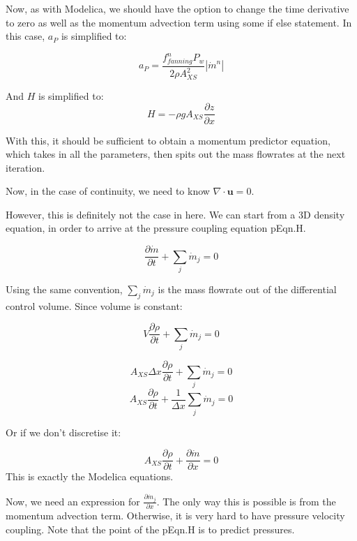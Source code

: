 \documentclass[masters]{ucbthesis}
\renewcommand{\_}{\kern-1.5pt\textunderscore\kern-1.5pt}
\begin{document}
Now, as with Modelica, we should have the option to change the time 
derivative to zero as well as the momentum advection term using some if 
else statement. In this case, $a_P$ is simplified to:

\begin{equation*}
	a_P = \frac{f_{fanning}^n P_w}{2 \rho A_{XS}^2} |\dot{m}^n|  
\end{equation*}

And $H$ is simplified to:
\begin{equation*}
	H = - \rho g A_{XS} \frac{\partial z}{\partial x}
\end{equation*}

With this, it should be sufficient to obtain a momentum predictor equation,
which takes in all the parameters, then spits out the mass flowrates 
at the next iteration.


Now, in the case of continuity, we need to 
know $\nabla \cdot \mathbf{u} = 0$.

However, this is definitely not the case in here. We can start from 
a 3D density equation, in order to arrive at the pressure coupling equation 
pEqn.H.

\begin{equation*}
	\frac{\partial \dot{m}}{\partial t} + \sum_j \dot{m}_j = 0
\end{equation*}

Using the same convention, $\sum_j \dot{m}_j$ is the mass flowrate out 
of the differential control volume. Since volume is constant:

\begin{equation*}
	V \frac{\partial \rho}{\partial t} + \sum_j \dot{m}_j = 0
\end{equation*}

\begin{equation*}
	A_{XS} \Delta x  \frac{\partial \rho}{\partial t} + \sum_j \dot{m}_j = 0
\end{equation*}
\begin{equation*}
	A_{XS} \frac{\partial \rho}{\partial t} + \frac{1}{\Delta x} \sum_j \dot{m}_j = 0
\end{equation*}

Or if we don't discretise it:

\begin{equation*}
	A_{XS} \frac{\partial \rho}{\partial t} + \frac{\partial \dot{m}}{\partial x} = 0
\end{equation*}
This is exactly the Modelica equations.

Now, we need an expression for $\frac{\partial \dot{m}_j}{\partial x}$. The 
only way this is possible is from the momentum advection term. Otherwise, 
it is very hard to have pressure velocity coupling. Note that the point 
of the pEqn.H is to predict pressures.
\end{document}
